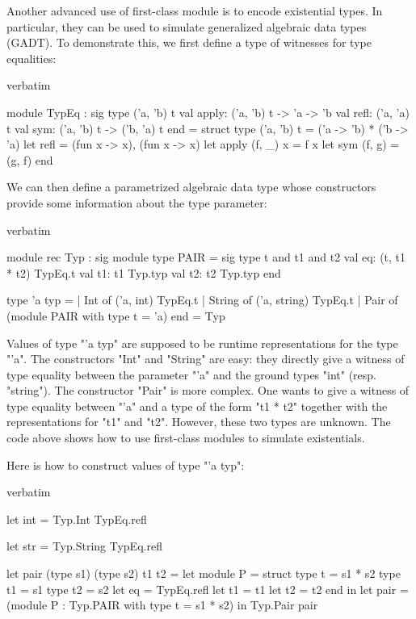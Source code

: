 \iffalse
Another advanced use of first-class module is to encode existential
types. In particular, they can be used to simulate generalized
algebraic data types (GADT). To demonstrate this, we first define a type
of witnesses for type equalities:

\begin{camlexample}{verbatim}
\begin{caml}
\begin{camlinput}
module TypEq : sig
  type ('a, 'b) t
  val apply: ('a, 'b) t -> 'a -> 'b
  val refl: ('a, 'a) t
  val sym: ('a, 'b) t -> ('b, 'a) t
end = struct
  type ('a, 'b) t = ('a -> 'b) * ('b -> 'a)
  let refl = (fun x -> x), (fun x -> x)
  let apply (f, _) x = f x
  let sym (f, g) = (g, f)
end
\end{camlinput}
\end{caml}
\end{camlexample}

We can then define a parametrized algebraic data type whose
constructors provide some information about the type parameter:

\begin{camlexample}{verbatim}
\begin{caml}
\begin{camlinput}
module rec Typ : sig
  module type PAIR = sig
    type t and t1 and t2
    val eq: (t, t1 * t2) TypEq.t
    val t1: t1 Typ.typ
    val t2: t2 Typ.typ
  end

  type 'a typ =
    | Int of ('a, int) TypEq.t
    | String of ('a, string) TypEq.t
    | Pair of (module PAIR with type t = 'a)
end = Typ
\end{camlinput}
\end{caml}
\end{camlexample}

Values of type "'a typ" are supposed to be runtime representations for
the type "'a". The constructors "Int" and "String" are easy: they
directly give a witness of type equality between the parameter "'a"
and the ground types "int" (resp. "string"). The constructor "Pair" is
more complex. One wants to give a witness of type equality between
"'a" and a type of the form "t1 * t2" together with the representations
for "t1" and "t2". However, these two types are unknown. The code above
shows how to use first-class modules to simulate existentials.

Here is how to construct values of type "'a typ":

\begin{camlexample}{verbatim}
\begin{caml}
\begin{camlinput}
let int = Typ.Int TypEq.refl

let str = Typ.String TypEq.refl

let pair (type s1) (type s2) t1 t2 =
  let module P = struct
    type t = s1 * s2
    type t1 = s1
    type t2 = s2
    let eq = TypEq.refl
    let t1 = t1
    let t2 = t2
  end in
  let pair = (module P : Typ.PAIR with type t = s1 * s2) in
  Typ.Pair pair
\end{camlinput}
\end{caml}
\end{camlexample}

